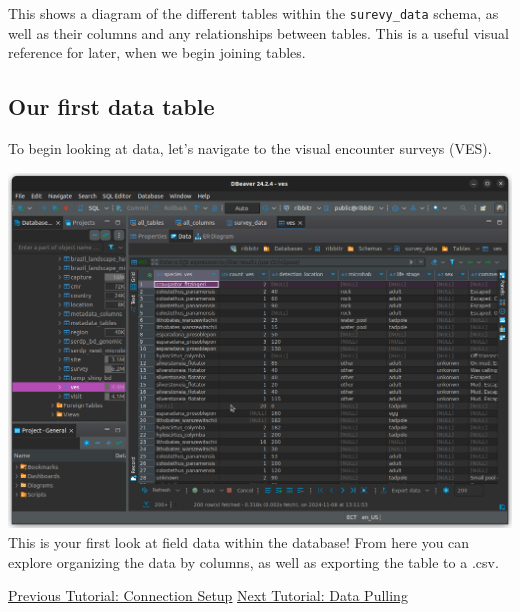 \documentclass[
  letterpaper,
  DIV=11,
  numbers=noendperiod]{scrartcl}
\begin{document}
This shows a diagram of the different tables within the
\texttt{surevy\_data} schema, as well as their columns and any
relationships between tables. This is a useful visual reference for
later, when we begin joining tables.

\subsection{Our first data table}\label{our-first-data-table-2}

To begin looking at data, let's navigate to the visual encounter surveys
(VES).

\includegraphics{images/DBeaver_data_discovery_05.png} This is your
first look at field data within the database! From here you can explore
organizing the data by columns, as well as exporting the table to a
.csv.

\href{01_connection_setup.html}{Previous Tutorial: Connection Setup}
\textbar{} \href{03_data_pulling.html}{Next Tutorial: Data Pulling}
\end{document}
